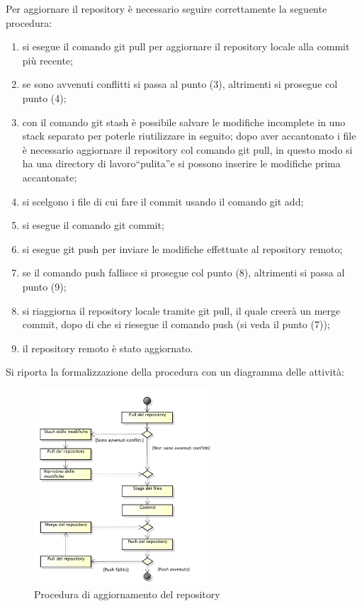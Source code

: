 					Per aggiornare il repository è necessario seguire correttamente la seguente procedura:
					\begin{enumerate}
						\item si esegue il comando git pull per aggiornare il repository locale alla commit più recente;
						\item se sono avvenuti conflitti si passa al punto (3), altrimenti si prosegue col punto (4);
						\item con il comando git stash è possibile salvare le modifiche incomplete in uno stack separato per poterle riutilizzare in seguito; dopo aver accantonato i file è necessario aggiornare il repository col comando git pull, in questo modo si ha una directory di lavoro“pulita”e si possono inserire le modifiche prima accantonate;
						\item si scelgono i file di cui fare il commit usando il comando git add;
						\item si esegue il comando git commit;
						\item si esegue git push per inviare le modifiche effettuate al repository remoto;
						\item se il comando push fallisce si prosegue col punto (8), altrimenti si passa al punto (9);
						\item si riaggiorna il repository locale tramite git pull, il quale creerà un merge commit, dopo di che si riesegue il comando push (si veda il punto (7));
						\item il repository remoto è stato aggiornato.
					\end{enumerate}
					Si riporta la formalizzazione della procedura con un diagramma delle attività:
					\begin{figure}[H]
						\centering
						\includegraphics[width=0.6\textwidth]{NormeDiProgetto/Pics/Commit}
						\caption{Procedura di aggiornamento del repository}
					\end{figure}
